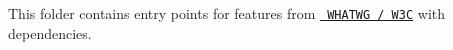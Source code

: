 This folder contains entry points for features from \href{https://github.com/zloirock/core-js/tree/v3\#web-standards}{\texttt{ WHATWG / W3C}} with dependencies. 